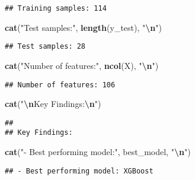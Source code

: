 \documentclass[
]{article}
\newenvironment{Shaded}{\begin{snugshade}}{\end{snugshade}}
\newcommand{\FunctionTok}[1]{\textcolor[rgb]{0.13,0.29,0.53}{\textbf{#1}}}
\newcommand{\NormalTok}[1]{#1}
\newcommand{\SpecialCharTok}[1]{\textcolor[rgb]{0.81,0.36,0.00}{\textbf{#1}}}
\newcommand{\StringTok}[1]{\textcolor[rgb]{0.31,0.60,0.02}{#1}}
\begin{document}
\begin{verbatim}
## Training samples: 114
\end{verbatim}

\begin{Shaded}
\begin{Highlighting}[]
\FunctionTok{cat}\NormalTok{(}\StringTok{"Test samples:"}\NormalTok{, }\FunctionTok{length}\NormalTok{(y\_test), }\StringTok{"}\SpecialCharTok{\textbackslash{}n}\StringTok{"}\NormalTok{)}
\end{Highlighting}
\end{Shaded}

\begin{verbatim}
## Test samples: 28
\end{verbatim}

\begin{Shaded}
\begin{Highlighting}[]
\FunctionTok{cat}\NormalTok{(}\StringTok{"Number of features:"}\NormalTok{, }\FunctionTok{ncol}\NormalTok{(X), }\StringTok{"}\SpecialCharTok{\textbackslash{}n}\StringTok{"}\NormalTok{)}
\end{Highlighting}
\end{Shaded}

\begin{verbatim}
## Number of features: 106
\end{verbatim}

\begin{Shaded}
\begin{Highlighting}[]
\FunctionTok{cat}\NormalTok{(}\StringTok{"}\SpecialCharTok{\textbackslash{}n}\StringTok{Key Findings:}\SpecialCharTok{\textbackslash{}n}\StringTok{"}\NormalTok{)}
\end{Highlighting}
\end{Shaded}

\begin{verbatim}
## 
## Key Findings:
\end{verbatim}

\begin{Shaded}
\begin{Highlighting}[]
\FunctionTok{cat}\NormalTok{(}\StringTok{"{-} Best performing model:"}\NormalTok{, best\_model, }\StringTok{"}\SpecialCharTok{\textbackslash{}n}\StringTok{"}\NormalTok{)}
\end{Highlighting}
\end{Shaded}

\begin{verbatim}
## - Best performing model: XGBoost
\end{verbatim}
\end{document}
